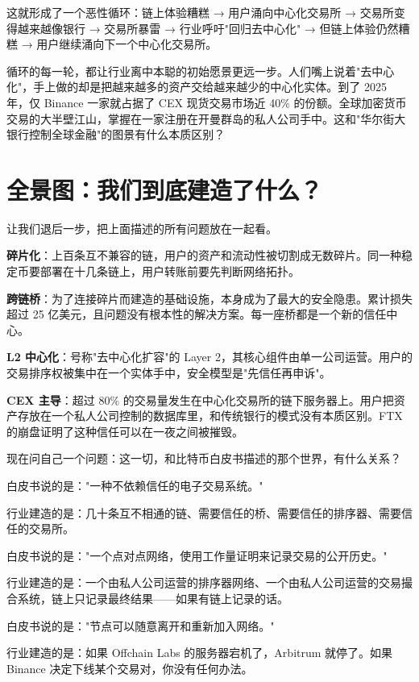 \documentclass[a4paper,12pt,openany]{ctexbook}
\begin{document}
这就形成了一个恶性循环：链上体验糟糕 → 用户涌向中心化交易所 → 交易所变得越来越像银行 → 交易所暴雷 → 行业呼吁"回归去中心化" → 但链上体验仍然糟糕 → 用户继续涌向下一个中心化交易所。

循环的每一轮，都让行业离中本聪的初始愿景更远一步。人们嘴上说着"去中心化"，手上做的却是把越来越多的资产交给越来越少的中心化实体。到了 2025 年，仅 Binance 一家就占据了 CEX 现货交易市场近 40\% 的份额。全球加密货币交易的大半壁江山，掌握在一家注册在开曼群岛的私人公司手中。这和"华尔街大银行控制全球金融"的图景有什么本质区别？


\section*{全景图：我们到底建造了什么？}


让我们退后一步，把上面描述的所有问题放在一起看。

\textbf{碎片化}：上百条互不兼容的链，用户的资产和流动性被切割成无数碎片。同一种稳定币要部署在十几条链上，用户转账前要先判断网络拓扑。

\textbf{跨链桥}：为了连接碎片而建造的基础设施，本身成为了最大的安全隐患。累计损失超过 25 亿美元，且问题没有根本性的解决方案。每一座桥都是一个新的信任中心。

\textbf{L2 中心化}：号称"去中心化扩容"的 Layer 2，其核心组件由单一公司运营。用户的交易排序权被集中在一个实体手中，安全模型是"先信任再申诉"。

\textbf{CEX 主导}：超过 80\% 的交易量发生在中心化交易所的链下服务器上。用户把资产存放在一个私人公司控制的数据库里，和传统银行的模式没有本质区别。FTX 的崩盘证明了这种信任可以在一夜之间被摧毁。

现在问自己一个问题：这一切，和比特币白皮书描述的那个世界，有什么关系？

白皮书说的是："一种不依赖信任的电子交易系统。"

行业建造的是：几十条互不相通的链、需要信任的桥、需要信任的排序器、需要信任的交易所。

白皮书说的是："一个点对点网络，使用工作量证明来记录交易的公开历史。"

行业建造的是：一个由私人公司运营的排序器网络、一个由私人公司运营的交易撮合系统，链上只记录最终结果——如果有链上记录的话。

白皮书说的是："节点可以随意离开和重新加入网络。"

行业建造的是：如果 Offchain Labs 的服务器宕机了，Arbitrum 就停了。如果 Binance 决定下线某个交易对，你没有任何办法。
\end{document}
